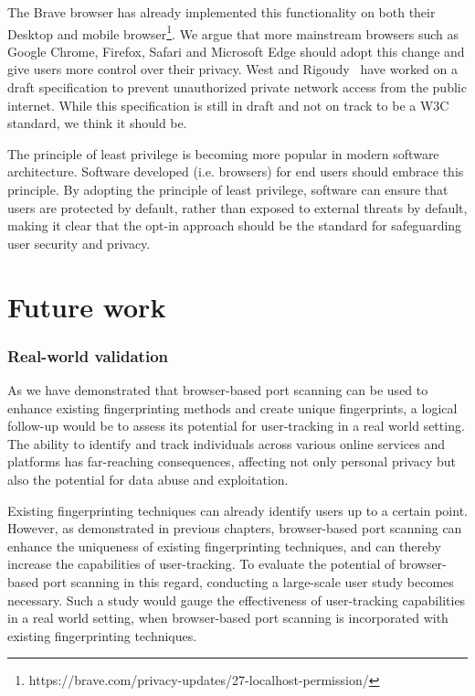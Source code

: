 The Brave browser has already implemented this functionality on both their Desktop and mobile browser\footnote{https://brave.com/privacy-updates/27-localhost-permission/}. We argue that more mainstream browsers such as Google Chrome, Firefox, Safari and Microsoft Edge should adopt this change and give users more control over their privacy. 
West and Rigoudy~\cite{rigoudy2023} have worked on a draft specification to prevent unauthorized private network access from the public internet. While this specification is still in draft and not on track to be a W3C standard, we think it should be. 

The principle of least privilege is becoming more popular in modern software architecture. Software developed (i.e. browsers) for end users should embrace this principle. By adopting the principle of least privilege, software can ensure that users are protected by default, rather than exposed to external threats by default, making it clear that the opt-in approach should be the standard for safeguarding user security and privacy.





\section{Future work}

\subsubsection{Real-world validation}

As we have demonstrated that browser-based port scanning can be used to enhance existing fingerprinting methods and create unique fingerprints, a logical follow-up would be to assess its potential for user-tracking in a real world setting.
The ability to identify and track individuals across various online services and platforms has far-reaching consequences, affecting not only personal privacy but also the potential for data abuse and exploitation.

Existing fingerprinting techniques can already identify users up to a certain point. However, as demonstrated in previous chapters, browser-based port scanning can enhance the uniqueness of existing fingerprinting techniques, and can thereby increase the capabilities of user-tracking.
To evaluate the potential of browser-based port scanning in this regard, conducting a large-scale user study becomes necessary. Such a study would gauge the effectiveness of user-tracking capabilities in a real world setting, when browser-based port scanning is incorporated with existing fingerprinting techniques.

